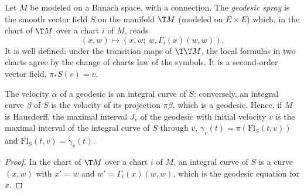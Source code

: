\begin{definition}
  \label{def:geodesic-spray}
  \leanok
  Let $M$ be modeled on a Banach space, with a connection. The \emph{geodesic spray} is the
  smooth vector field $S$ on the manifold $\T M$ (modeled on $E \times E$) which, in the chart of
  $\T M$ over a chart $i$ of $M$, reads
  \[
    (x, w) \longmapsto (x, w;\ w, \Gamma_i(x)(w, w)).
  \]
  It is well defined: under the transition maps of $\T\T M$, the local formulas in two charts
  agree by the change of charts law of the symbols. It is a second-order vector field,
  $\pi_* S(v) = v$.
\end{definition}

\begin{theorem}
  \label{thm:geodesic-spray-flow}
  \leanok
  The velocity $\dot\alpha$ of a geodesic is an integral curve of $S$; conversely, an integral
  curve $\beta$ of $S$ is the velocity of its projection $\pi\beta$, which is a geodesic. Hence,
  if $M$ is Hausdorff, the maximal interval $J_v$ of the geodesic with initial velocity $v$ is the
  maximal interval of the integral curve of $S$ through $v$, $\gamma_v(t) = \pi(\mathrm{Fl}_S(t, v))$
  and $\mathrm{Fl}_S(t, v) = \dot\gamma_v(t)$.
\end{theorem}

\begin{proof}
  \leanok
  In the chart of $\T M$ over a chart $i$ of $M$, an integral curve of $S$ is a curve $(x, w)$
  with $x' = w$ and $w' = \Gamma_i(x)(w, w)$, which is the geodesic equation for $x$.
\end{proof}


